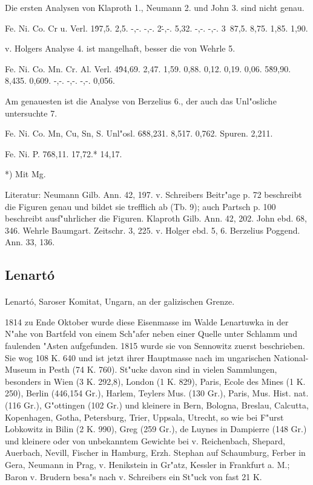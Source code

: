 \documentclass[a4paper, 11pt, oneside]{article}
\begin{document}
Die ersten Analysen von Klaproth 1., Neumann 2. und John 3. sind nicht genau.

Fe. Ni. Co. Cr u. Verl.  
1\. 97,5. 2,5. -,-. -,-.  
2\.  -,-. 5,32.  -,-.  -,-.  
3\ 87,5. 8,75. 1,85. 1,90.

v. Holgers Analyse 4. ist mangelhaft, besser die von Wehrle 5.

Fe. Ni. Co. Mn. Cr. Al. Verl.  
4\. 94,69. 2,47. 1,59. 0,88. 0,12. 0,19. 0,06.  
5\. 89,90. 8,435. 0,609. -,-. -,-. -,-. 0,056.

Am genauesten ist die Analyse von Berzelius 6., der auch das Unl"osliche untersuchte 7.

Fe. Ni. Co. Mn, Cu, Sn, S. Unl"osl.  
6\. 88,231. 8,517. 0,762. Spuren. 2,211.

Fe. Ni. P.  
7\. 68,11. 17,72.* 14,17.

*) Mit Mg.

Literatur: Neumann Gilb. Ann. 42, 197. v. Schreibers Beitr"age p. 72 beschreibt die Figuren genau und bildet sie trefflich ab (Tb. 9); auch Partsch p. 100 beschreibt ausf"uhrlicher die Figuren. Klaproth Gilb. Ann. 42, 202. John ebd. 68, 346. Wehrle Baumgart. Zeitschr. 3, 225. v. Holger ebd. 5, 6. Berzelius Poggend. Ann. 33, 136.

\subsection{Lenartó}
\normalsize
\paragraph{}
Lenartó, Saroser Komitat, Ungarn, an der galizischen Grenze.

1814 zu Ende Oktober wurde diese Eisenmasse im Walde Lenartuwka in der N"ahe von Bartfeld von einem Sch"afer neben einer Quelle unter Schlamm und faulenden "Asten aufgefunden. 1815 wurde sie von Sennowitz zuerst beschrieben. Sie wog 108 K. 640 und ist jetzt ihrer Hauptmasse nach im ungarischen National-Museum in Pesth (74 K. 760). St"ucke davon sind in vielen Sammlungen, besonders in Wien (3 K. 292,8), London (1 K. 829), Paris, Ecole des Mines (1 K. 250), Berlin (446,154 Gr.), Harlem, Teylers Mus. (130 Gr.), Paris, Mus. Hist. nat. (116 Gr.), G"ottingen (102 Gr.) und kleinere in Bern, Bologna, Breslau, Calcutta, Kopenhagen, Gotha, Petersburg, Trier, Uppsala, Utrecht, so wie bei F"urst Lobkowitz in Bilin (2 K. 990), Greg (259 Gr.), de Luynes in Dampierre (148 Gr.) und kleinere oder von unbekanntem Gewichte bei v. Reichenbach, Shepard, Auerbach, Nevill, Fischer in Hamburg, Erzh. Stephan auf Schaumburg, Ferber in Gera, Neumann in Prag, v. Henikstein in Gr"atz, Kessler in Frankfurt a. M.; Baron v. Brudern besa"s nach v. Schreibers ein St"uck von fast 21 K.
\end{document}
